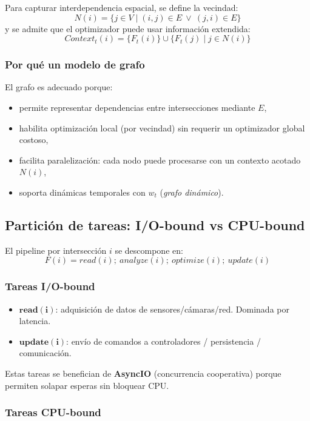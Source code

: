 \documentclass[12pt]{article}
\begin{document}
Para capturar interdependencia espacial, se define la vecindad:
\[
N(i) = \{ j \in V \mid (i,j)\in E \ \lor\ (j,i)\in E \}
\]
y se admite que el optimizador puede usar información extendida:
\[
Context_t(i) = \{F_t(i)\} \cup \{F_t(j)\mid j\in N(i)\}
\]

\subsubsection{Por qué un modelo de grafo}

El grafo es adecuado porque:
\begin{itemize}
\item permite representar dependencias entre intersecciones mediante \(E\),
\item habilita optimización local (por vecindad) sin requerir un optimizador global costoso,
\item facilita paralelización: cada nodo puede procesarse con un contexto acotado \(N(i)\),
\item soporta dinámicas temporales con \(w_t\) (\textit{grafo dinámico}).
\end{itemize}

\subsection{Partición de tareas: I/O-bound vs CPU-bound}

El pipeline por intersección \(i\) se descompone en:
\[
F(i) = read(i); \ analyze(i); \ optimize(i); \ update(i)
\]

\subsubsection{Tareas I/O-bound}

\begin{itemize}
\item \(\mathbf{read(i)}\): adquisición de datos de sensores/cámaras/red. Dominada por latencia.
\item \(\mathbf{update(i)}\): envío de comandos a controladores / persistencia / comunicación.
\end{itemize}

Estas tareas se benefician de \textbf{AsyncIO} (concurrencia cooperativa) porque permiten solapar esperas sin bloquear CPU.

\subsubsection{Tareas CPU-bound}
\end{document}
